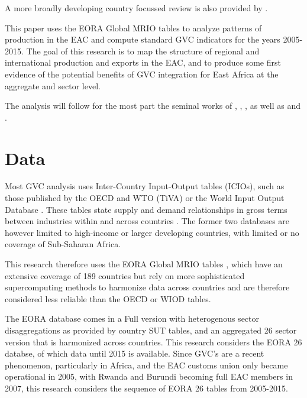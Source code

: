 \documentclass[a4paper]{article}
\begin{document}
A more broadly developing country focussed review is also provided by \citet{kowalski2015participation}. \newline 

This paper uses the EORA Global MRIO tables \citet{lenzen2012mapping, lenzen2013building} to analyze patterns of production in the EAC and compute standard GVC indicators for the years 2005-2015. The goal of this research is to map the structure of regional and international production and exports in the EAC, and to produce some first evidence of the potential benefits of GVC integration for East Africa at the aggregate and sector level. \newline

The analysis will follow for the most part the seminal works of \citet{hummels2001nature}, \citet{koopman2014tracing}, \citet{wang2013quantifying}, as well as \citet{Kummritz20161} and \citet{Kummritz20162}. 

\section{Data}
Most GVC analysis uses Inter-Country Input-Output tables (ICIOs), such as those
published by the OECD and WTO (TiVA) or the World Input Output Database \citep{timmer2012world}. These tables state supply and demand relationships in gross terms between industries within and across countries \citep{Kummritz2014}. The former two databases are however limited to high-income or larger developing countries, with limited or no coverage of Sub-Saharan Africa. \newline

This research therefore uses the EORA Global MRIO tables \citep{lenzen2012mapping, lenzen2013building}, which have an extensive coverage of 189 countries but rely on more sophisticated supercomputing methods to harmonize data across countries and are therefore considered less reliable than the OECD or WIOD tables. \newline

The EORA database comes in a Full version with heterogenous sector disaggregations as provided by country SUT tables, and an aggregated 26 sector version that is harmonized across countries. This research considers the EORA 26 databse, of which data until 2015 is available. Since GVC's are a recent phenomenon, particularly in Africa, and the EAC customs union only became operational in 2005, with Rwanda and Burundi becoming full EAC members in 2007, this research considers the sequence of EORA 26 tables from 2005-2015. \newline
\end{document}

